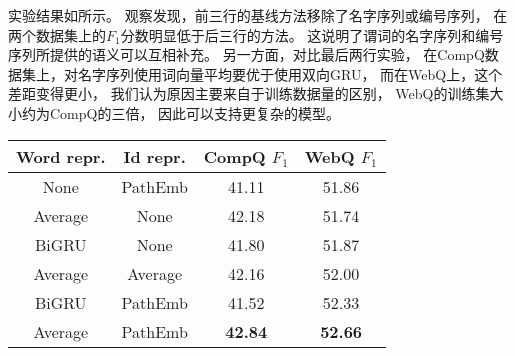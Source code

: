 实验结果如所示。
观察发现，前三行的基线方法移除了名字序列或编号序列，
在两个数据集上的$F_1$分数明显低于后三行的方法。
这说明了谓词的名字序列和编号序列所提供的语义可以互相补充。
另一方面，对比最后两行实验，
在CompQ数据集上，对名字序列使用词向量平均要优于使用双向GRU，
而在WebQ上，这个差距变得更小，
我们认为原因主要来自于训练数据量的区别，
WebQ的训练集大小约为CompQ的三倍，
因此可以支持更复杂的模型。

\begin{table}[ht]
    \centering
    \begin{tabular} {c|c|c|c}
        \hline
        Word repr.  &  Id repr.  &   CompQ $F_1$  & WebQ $F_1$ \\
        \hline
        None        &  PathEmb  &   41.11   & 51.86 \\      %
        Average     &  None     &   42.18   & 51.74 \\      %
        BiGRU       &  None     &   41.80   & 51.87 \\      %
        Average     &  Average  &   42.16   & 52.00 \\      %
        BiGRU       &  PathEmb  &   41.52   & 52.33 \\      %
        Average     &  PathEmb  &   \textbf{42.84}   & \textbf{52.66} \\      %
        \hline
    \end{tabular}
    \label{tab:compqa-abl-pw}
\end{table}



